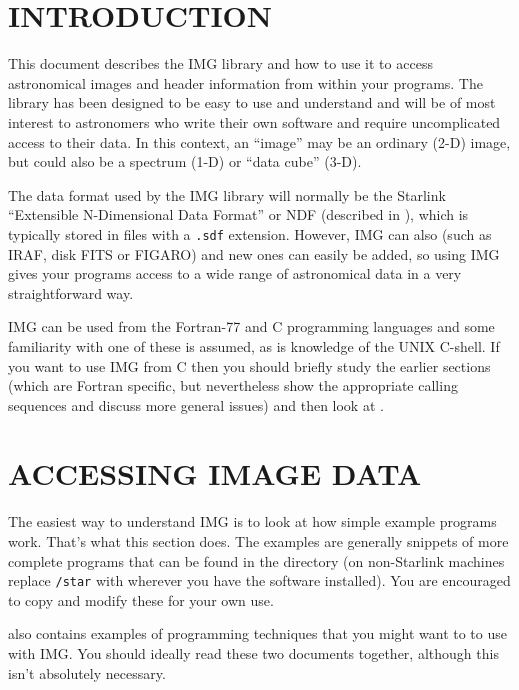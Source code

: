 \documentclass[twoside,11pt,nolof]{starlink}
\providecommand{\myverb}[1]{{\texttt{#1}}}
\begin{document}
\scfrontmatter

\section{INTRODUCTION}
This document describes the IMG library and how to use it to access
astronomical images and header information from within your
programs. The library has been designed to be easy to use and
understand and will be of most interest to astronomers who write their
own software and require uncomplicated access to their data.  In this
context, an ``image'' may be an ordinary (2-D) image, but could also be
a spectrum (1-D) or ``data cube'' (3-D).

The data format used by the IMG library will normally be the Starlink
``Extensible N-Dimensional Data Format'' or NDF (described in
), which is typically stored in files with a
\myverb{.sdf} extension.  However, IMG can also  (such as IRAF, disk FITS
or FIGARO) and new ones can easily be added, so using IMG gives your
programs access to a wide range of astronomical data in a very
straightforward way.

IMG can be used from the Fortran-77 and C programming languages and some
familiarity with one of these is assumed, as is knowledge of
the UNIX C-shell. If you want to use IMG from C then you should
briefly study the earlier sections (which are Fortran specific, but
nevertheless show the appropriate calling sequences and discuss more
general issues) and then look at
.

\section{ACCESSING IMAGE DATA \label{USINGIMG}}
The easiest way to understand IMG is to look at how simple example
programs work. That's what this section does. The examples are generally
snippets of more complete programs that can be found in the
directory
\htmladdnormallink{\myverb{/star/bin/examples/img}}{../../bin/examples/img}
(on non-Starlink machines replace \myverb{/star} with wherever you
have the software installed).  You are encouraged to copy and modify
these for your own use.

 also contains examples of programming
techniques that you might want to to use with IMG. You should ideally
read these two documents together, although this isn't absolutely
necessary.
\end{document}
